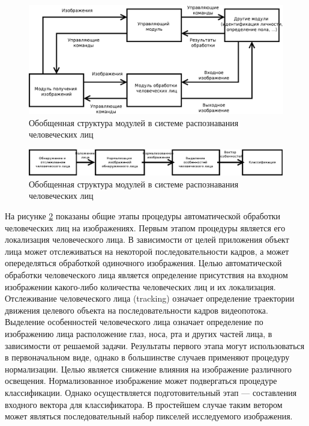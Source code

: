 \begin{figure}
  \centering
  \includegraphics[width=\textwidth]{inc/dia/face-analyse-relation}
  \caption{Обобщенная структура модулей в системе распознавания человеческих лиц}
  \label{fig:sstructure}
\end{figure}

\begin{figure}
  \centering
  \includegraphics[width=\textwidth]{inc/dia/face-analyse}
  \caption{Обобщенная структура модулей в системе распознавания человеческих лиц}
  \label{fig:face-analyse-structure}
\end{figure}


На рисунке \ref{fig:face-analyse-structure} показаны общие этапы процедуры автоматической обработки человеческих лиц на изображениях. Первым этапом процедуры является его локализация человеческого лица. В зависимости от целей приложения объект лица может отслеживаться на некоторой последовательности кадров, а может опеределяться обработкой одиночного изображения. Целью автоматической обработки человеческого лица является определение присутствия на входном изображении какого-либо количества человеческих лиц и их локализация. Отслеживание человеческого лица (tracking) означает определение траектории движения целевого объекта на последовательности кадров видеопотока. Выделение особенностей человеческого лица означает определение по изображению лица расположение глаз, носа, рта и других частей лица, в зависимости от решаемой задачи. Результаты первого этапа могут использоваться в первоначальном виде, однако в большинстве случаев применяют процедуру нормализации. Целью является снижение влияния на изображение различного освещения. Нормализованное изображение может подвергаться процедуре классификации. Однако осуществляется подготовительный этап --- составления входного вектора для классификатора. В простейшем случае таким ветором может являться последовательный набор пикселей исследуемого изображения.

